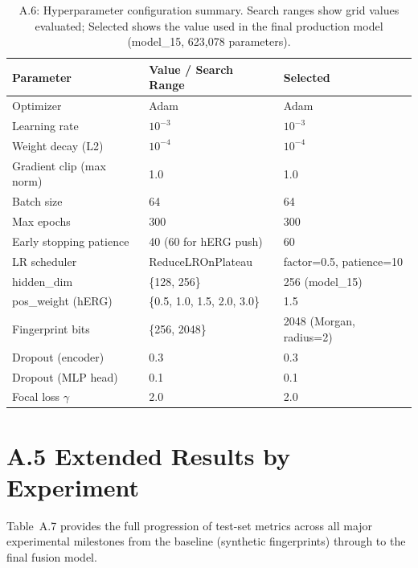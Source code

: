 \documentclass[a4paper,11pt,twoside]{report}
\begin{document}
\begin{table}[htbp]
\centering
\small
\caption{A.6: Hyperparameter configuration summary. Search ranges show grid values evaluated; Selected shows the value used in the final production model (model\_15, 623,078 parameters).}
\label{tab:hyperparam_summary}
\begin{tabular}{l|l|l}
\hline
\textbf{Parameter} & \textbf{Value / Search Range} & \textbf{Selected} \\
\hline
Optimizer & Adam & Adam \\
Learning rate & $10^{-3}$ & $10^{-3}$ \\
Weight decay (L2) & $10^{-4}$ & $10^{-4}$ \\
Gradient clip (max norm) & 1.0 & 1.0 \\
Batch size & 64 & 64 \\
Max epochs & 300 & 300 \\
Early stopping patience & 40 (60 for hERG push) & 60 \\
LR scheduler & ReduceLROnPlateau & factor=0.5, patience=10 \\
hidden\_dim & \{128, 256\} & 256 (model\_15) \\
pos\_weight (hERG) & \{0.5, 1.0, 1.5, 2.0, 3.0\} & 1.5 \\
Fingerprint bits & \{256, 2048\} & 2048 (Morgan, radius=2) \\
Dropout (encoder) & 0.3 & 0.3 \\
Dropout (MLP head) & 0.1 & 0.1 \\
Focal loss $\gamma$ & 2.0 & 2.0 \\
\hline
\end{tabular}
\end{table}

\section*{A.5 Extended Results by Experiment}

Table~A.7 provides the full progression of test-set metrics across all major experimental milestones from the baseline (synthetic fingerprints) through to the final fusion model.
\end{document}
